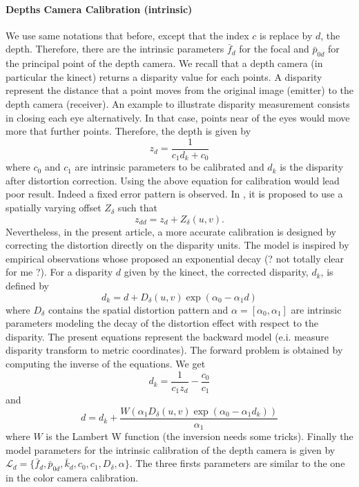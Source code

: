 \documentclass[11pt,a4paper]{article}
\begin{document}
\paragraph{Depths Camera Calibration (intrinsic)} We use same notations that before, except that the index $c$ is replace by $d$, the depth. Therefore, there are the intrinsic parameters $\bar{f}_d$ for the focal and $\bar{p}_{0d}$ for the principal point of the depth camera. We recall that a depth camera (in particular the kinect) returns a disparity value for each points. A disparity represent the distance that a point moves from the original image (emitter) to the depth camera (receiver). An example to illustrate disparity measurement consists in closing each eye alternatively. In that case, points near of the eyes would move more that further points. Therefore, the depth is given by 
\begin{equation}
z_d = \frac{1}{c_1d_k+c_0}
\end{equation}
where $c_0$ and $c_1$ are intrinsic parameters to be calibrated and $d_k$ is the disparity after distortion correction. Using the above equation for calibration would lead poor result. Indeed a fixed error pattern is observed. In \cite{Smisek2011}, it is proposed to use a spatially varying offset $Z_{\delta}$ such that
\begin{equation}
z_{dd} = z_d + Z_{\delta}(u,v).
\end{equation}
Nevertheless, in the present article, a more accurate calibration is designed by correcting the distortion directly on the disparity units. The model is inspired by empirical observations whose proposed an exponential decay (? not totally clear for me ?). For a disparity $d$ given by the kinect, the corrected disparity, $d_k$, is defined by
\begin{equation}
d_k = d + D_{\delta}(u,v) \exp(\alpha_0 - \alpha_1 d)
\end{equation}
where $D_{\delta}$ contains the spatial distortion pattern and $\alpha = [\alpha_0,\alpha_1]$ are intrinsic parameters modeling the decay of the distortion effect with respect to the disparity. The present equations represent the backward model (e.i. measure disparity transform to metric coordinates). The forward problem is obtained by computing the inverse of the equations. We get 
\begin{equation}
d_k = \frac{1}{c_1z_d} - \frac{c_0}{c_1}
\end{equation}
and
\begin{equation}
d = d_k + \frac{W(\alpha_1D_{\delta}(u,v) \exp (\alpha_0-\alpha_1d_k))}{\alpha_1}
\end{equation}
where $W$ is the Lambert W function (the inversion needs some tricks). Finally the model parameters for the intrinsic calibration of the depth camera is given by $\mathcal{L}_d = \{\bar{f}_d,\bar{p}_{0d},\bar{k}_d, c_0, c_1, D_{\delta}, \alpha \}$. The three firsts parameters are similar to the one in the color camera calibration.
\end{document}
